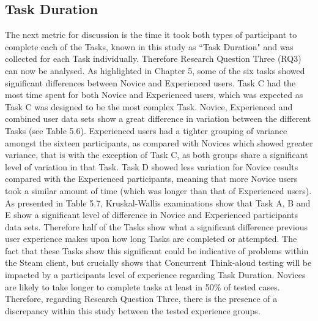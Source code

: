 \subsection{Task Duration}
The next metric for discussion is the time it took both types of participant to complete each of the Tasks, known in this study as ``Task Duration" and was collected for each Task individually. Therefore Research Question Three (RQ3) can now be analysed. As highlighted in Chapter 5, some of the six tasks showed significant differences between Novice and Experienced users. Task C had the most time spent for both Novice and Experienced users, which was expected as Task C was designed to be the most complex Task. Novice, Experienced and combined user data sets show a great difference in variation between the different Tasks (see Table 5.6). Experienced users had a tighter grouping of variance amongst the sixteen participants, as compared with Novices which showed greater variance, that is with the exception of Task C, as both groups share a significant level of variation in that Task. Task D showed less variation for Novice results compared with the Experienced participants, meaning that more Novice users took a similar amount of time (which was longer than that of Experienced users). As presented in Table 5.7, Kruskal-Wallis examinations show that Task A, B and E show a significant level of difference in Novice and Experienced participants data sets. Therefore half of the Tasks show what a significant difference previous user experience makes upon how long Tasks are completed or attempted. The fact that these Tasks show this significant could be indicative of problems within the Steam client, but crucially shows that Concurrent Think-aloud testing will be impacted by a participants level of experience regarding Task Duration. Novices are likely to take longer to complete tasks at least in 50\% of tested cases. Therefore, regarding Research Question Three, there is the presence of a discrepancy within this study between the tested experience groups.

